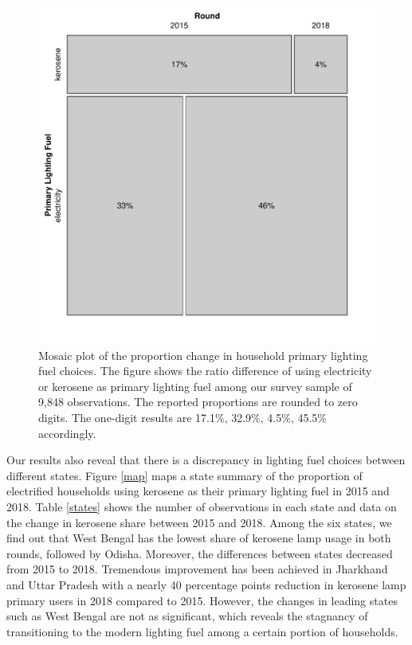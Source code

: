 \documentclass[11pt,english]{article}
\theoremstyle{plain} \newtheorem{claim}{Claim}
\theoremstyle{plain} \newtheorem{prop}{Proposition}
\theoremstyle{plain} \newtheorem{hypo}{Hypothesis}
\begin{document}
\begin{figure}[h!]
\centering
\includegraphics[scale=1]{Figures/Mosaic.pdf}
\caption{Mosaic plot of the proportion change in household primary lighting fuel choices. The figure shows the ratio difference of using electricity or kerosene as primary lighting fuel among our survey sample of 9,848 observations. The reported proportions are rounded to zero digits. The one-digit results are 17.1\%, 32.9\%, 4.5\%, 45.5\% accordingly.}
\label{mosaic}
\end{figure}

Our results also reveal that there is a discrepancy in lighting fuel choices between different states. Figure \ref{map} maps a state summary of the proportion of electrified households using kerosene as their primary lighting fuel in 2015 and 2018. Table \ref{states} shows the number of observations in each state and data on the change in kerosene share between 2015 and 2018. Among the six states, we find out that West Bengal has the lowest share of kerosene lamp usage in both rounds, followed by Odisha. Moreover, the differences between states decreased from 2015 to 2018. Tremendous improvement has been achieved in Jharkhand and Uttar Pradesh with a nearly 40 percentage points reduction in kerosene lamp primary users in 2018 compared to 2015. However, the changes in leading states such as West Bengal are not as significant, which reveals the stagnancy of transitioning to the modern lighting fuel among a certain portion of households.
\end{document}
